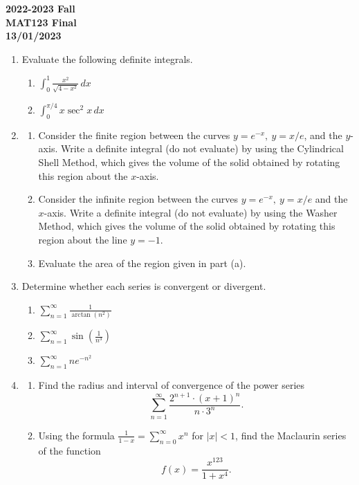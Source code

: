 \documentclass[a4paper, 12pt]{article}
\begin{document}
\pagestyle{empty}

\begin{center}
\textbf{2022-2023 Fall\\MAT123 Final\\13/01/2023}
\end{center}

\begin{enumerate}[leftmargin=*,label=\textbf{\arabic*.}]
\item Evaluate the following definite integrals.
\begin{enumerate}[leftmargin=*,label=\textbf{\alph*.}]
\item $\displaystyle\int_0^1\frac{x^2}{\sqrt{4-x^2}}\,dx$
\item $\displaystyle\int_0^{\pi/4}x\sec^2x\,dx$
\end{enumerate}

\item
\begin{enumerate}[leftmargin=*,label=\textbf{\alph*.}]
\item Consider the finite region between the curves $y= e^{-x},\:y=x/ e$, and the $y$-axis. Write a definite integral (do not evaluate) by using the Cylindrical Shell Method, which gives the volume of the solid obtained by rotating this region about the $x$-axis.

\item Consider the infinite region between the curves $y= e^{-x},\:y=x/ e$ and the $x$-axis. Write a definite integral (do not evaluate) by using the Washer Method, which gives the volume of the solid obtained by rotating this region about the line $y=-1$.

\item Evaluate the area of the region given in part (a).
\end{enumerate}

\item Determine whether each series is convergent or divergent.
\begin{enumerate}[leftmargin=*,label=\textbf{\alph*.}]
\item $\displaystyle\sum_{n=1}^\infty\frac1{\arctan\left(n^2\right)}$
\item $\displaystyle\sum_{n=1}^\infty\sin\left(\frac1{n^3}\right)$
\item $\displaystyle\sum_{n=1}^\infty n e^{-n^2}$
\end{enumerate}

\item
\begin{enumerate}[leftmargin=*,label=\textbf{\alph*.}]
\item Find the radius and interval of convergence of the power series
\[\sum_{n=1}^\infty\frac{2^{n+1}\cdot(x+1)^n}{n\cdot3^n}.\]

\item Using the formula $\displaystyle\frac1{1-x}=\sum_{n=0}^\infty x^n$ for $\left|x\right|<1$, find the Maclaurin series of the function
\[f(x)=\frac{x^{123}}{1+x^4}.\]
\end{enumerate}
\end{enumerate}
\end{document}
